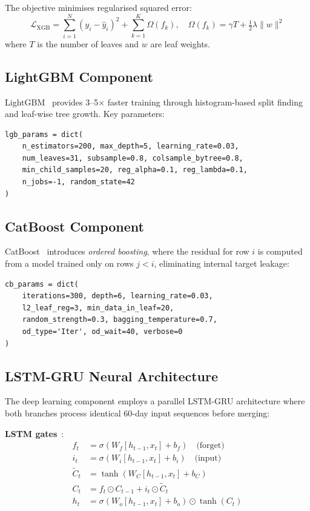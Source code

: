 \documentclass[10pt,a4paper,twoside]{article}
\begin{document}
The objective minimises regularised squared error:
\begin{equation}
  \mathcal{L}_{\text{XGB}} = \sum_{i=1}^{N}(y_i - \hat{y}_i)^2 + \sum_{k=1}^{K}\Omega(f_k),
  \quad \Omega(f_k) = \gamma T + \tfrac{1}{2}\lambda\|w\|^2
\end{equation}
where $T$ is the number of leaves and $w$ are leaf weights.

\subsection{LightGBM Component}

LightGBM~\cite{ke2017} provides 3--5$\times$ faster training through
histogram-based split finding and leaf-wise tree growth. Key parameters:
\begin{lstlisting}[caption={LightGBM configuration.}]
lgb_params = dict(
    n_estimators=200, max_depth=5, learning_rate=0.03,
    num_leaves=31, subsample=0.8, colsample_bytree=0.8,
    min_child_samples=20, reg_alpha=0.1, reg_lambda=0.1,
    n_jobs=-1, random_state=42
)
\end{lstlisting}

\subsection{CatBoost Component}

CatBoost~\cite{prokhorenkova2018} introduces \emph{ordered boosting}, where
the residual for row $i$ is computed from a model trained only on rows $j < i$,
eliminating internal target leakage:
\begin{lstlisting}[caption={CatBoost configuration.}]
cb_params = dict(
    iterations=300, depth=6, learning_rate=0.03,
    l2_leaf_reg=3, min_data_in_leaf=20,
    random_strength=0.3, bagging_temperature=0.7,
    od_type='Iter', od_wait=40, verbose=0
)
\end{lstlisting}

\subsection{LSTM-GRU Neural Architecture}

The deep learning component employs a parallel LSTM-GRU architecture where both
branches process identical 60-day input sequences before merging:

\textbf{LSTM gates}~\cite{hochreiter1997}:
\begin{align}
  f_t &= \sigma(W_f [h_{t-1}, x_t] + b_f) \quad\text{(forget)} \\
  i_t &= \sigma(W_i [h_{t-1}, x_t] + b_i) \quad\text{(input)} \\
  \tilde{C}_t &= \tanh(W_C [h_{t-1}, x_t] + b_C) \\
  C_t &= f_t \odot C_{t-1} + i_t \odot \tilde{C}_t \\
  h_t &= \sigma(W_o [h_{t-1}, x_t] + b_o) \odot \tanh(C_t)
\end{align}
\end{document}
